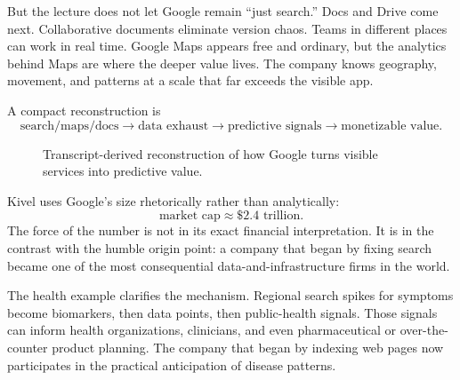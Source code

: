 But the lecture does not let Google remain ``just search.'' Docs and Drive come next. Collaborative documents eliminate version chaos. Teams in different places can work in real time. Google Maps appears free and ordinary, but the analytics behind Maps are where the deeper value lives. The company knows geography, movement, and patterns at a scale that far exceeds the visible app.

A compact reconstruction is
\begin{equation}
\text{search/maps/docs} \to \text{data exhaust} \to \text{predictive signals} \to \text{monetizable value}.
\end{equation}

\begin{figure}[htbp]
\centering
{}
\caption{Transcript-derived reconstruction of how Google turns visible services into predictive value.}
\end{figure}

Kivel uses Google's size rhetorically rather than analytically:
\begin{equation}
\text{market cap} \approx \$2.4 \text{ trillion}.
\end{equation}
The force of the number is not in its exact financial interpretation. It is in the contrast with the humble origin point: a company that began by fixing search became one of the most consequential data-and-infrastructure firms in the world.

The health example clarifies the mechanism. Regional search spikes for symptoms become biomarkers, then data points, then public-health signals. Those signals can inform health organizations, clinicians, and even pharmaceutical or over-the-counter product planning. The company that began by indexing web pages now participates in the practical anticipation of disease patterns.

